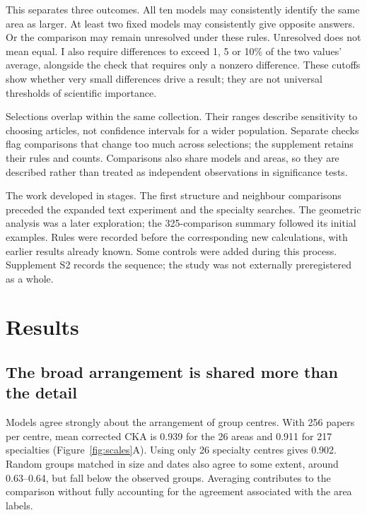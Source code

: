 This separates three outcomes. All ten models may consistently identify the same area as larger. At least two fixed models may consistently give opposite answers. Or the comparison may remain unresolved under these rules. Unresolved does not mean equal. I also require differences to exceed 1, 5 or 10\% of the two values' average, alongside the check that requires only a nonzero difference. These cutoffs show whether very small differences drive a result; they are not universal thresholds of scientific importance.

Selections overlap within the same collection. Their ranges describe sensitivity to choosing articles, not confidence intervals for a wider population. Separate checks flag comparisons that change too much across selections; the supplement retains their rules and counts. Comparisons also share models and areas, so they are described rather than treated as independent observations in significance tests.

The work developed in stages. The first structure and neighbour comparisons preceded the expanded text experiment and the specialty searches. The geometric analysis was a later exploration; the 325-comparison summary followed its initial examples. Rules were recorded before the corresponding new calculations, with earlier results already known. Some controls were added during this process. Supplement S2 records the sequence; the study was not externally preregistered as a whole.

\section{Results}
\subsection{The broad arrangement is shared more than the detail}
Models agree strongly about the arrangement of group centres. With 256 papers per centre, mean corrected CKA is 0.939 for the 26 areas and 0.911 for 217 specialties (Figure~\ref{fig:scales}A). Using only 26 specialty centres gives 0.902. Random groups matched in size and dates also agree to some extent, around 0.63--0.64, but fall below the observed groups. Averaging contributes to the comparison without fully accounting for the agreement associated with the area labels.

